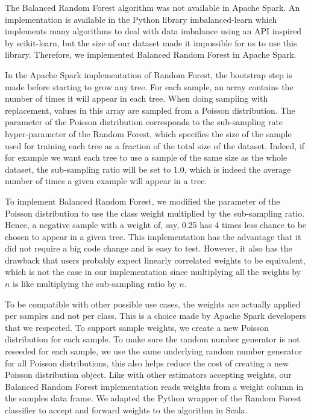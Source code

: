 \documentclass[conference]{IEEEtran}
\begin{document}
The Balanced Random Forest algorithm was not available in Apache Spark.
An implementation is available in the Python library
imbalanced-learn\cite{imbalance} which implements many algorithms to deal
with data imbalance using an API inspired by scikit-learn\cite{imbalance}, but the size of
our dataset made it impossible for us to use this library. Therefore, we
implemented Balanced Random Forest in Apache Spark.

In the Apache Spark implementation of Random Forest, the bootstrap step is
made before starting to grow any tree. For each sample, an array contains
the number of times it will appear in each tree. When doing sampling with
replacement, values in this array are sampled from a Poisson distribution.
The parameter of the Poisson distribution corresponds to the sub-sampling
rate hyper-parameter of the Random Forest, which specifies the size of the
sample used for training each tree as a fraction of the total size of the
dataset. Indeed, if for example we want each tree to use a sample of the
same size as the whole dataset, the sub-sampling ratio will be set to 1.0,
which is indeed the average number of times a given example will appear in a tree.

To implement Balanced Random Forest, we modified the parameter of
the Poisson distribution to use the class weight multiplied by the
sub-sampling ratio. Hence, a negative sample with a weight
of, say, 0.25 has 4 times less chance to be chosen to appear in a given tree. This
implementation has the advantage that it did not require a big code change
and is easy to test. However, it also has the drawback that users probably
expect linearly correlated weights to be equivalent, which is not the case
in our implementation since multiplying all the weights by $n$ is like multiplying
the sub-sampling ratio by $n$.

To be compatible with other possible use cases, the weights are
actually applied per samples and not per class. This is a choice made by
Apache Spark developers that we respected. To support sample
weights, we create a new Poisson distribution for each sample. To make sure
the random number generator is not reseeded for each sample, we use the
same underlying random number generator for all Poisson distributions, this
also helps reduce the cost of creating a new Poisson distribution object.
Like with other estimators accepting weights, our Balanced Random Forest
implementation reads weights from a weight column in the samples data frame.
We adapted the Python wrapper of the Random Forest classifier to accept and
forward weights to the algorithm in Scala.
\end{document}

